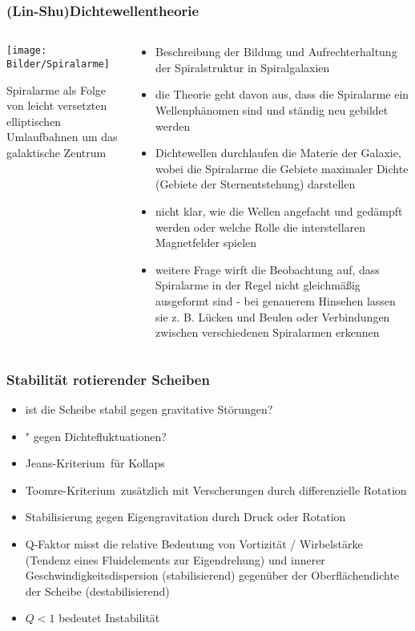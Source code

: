 \documentclass{beamer}
\begin{document}
\begin{frame}\frametitle{(Lin-Shu)Dichtewellentheorie}

\begin{columns}

\begin{column}{.48\textwidth}

\texttt{[image: Bilder/Spiralarme]}

Spiralarme als Folge von leicht versetzten elliptischen Umlaufbahnen um das galaktische Zentrum

\end{column}

\hfill

\begin{column}{.48\textwidth}

\tiny
\begin{itemize}
\item Beschreibung der Bildung und Aufrechterhaltung der Spiralstruktur in Spiralgalaxien
\item die Theorie geht davon aus, dass die Spiralarme ein Wellenphänomen sind und ständig neu gebildet werden
\item Dichtewellen durchlaufen die Materie der Galaxie, wobei die Spiralarme die Gebiete maximaler Dichte (Gebiete der Sternentstehung) darstellen
\item nicht klar, wie die Wellen angefacht und gedämpft werden oder welche Rolle die interstellaren Magnetfelder spielen
\item weitere Frage wirft die Beobachtung auf, dass Spiralarme in der Regel nicht gleichmäßig ausgeformt sind - bei genauerem Hinsehen lassen sie z. B. Lücken und Beulen oder Verbindungen zwischen verschiedenen Spiralarmen erkennen
\end{itemize}

\end{column}

\end{columns}

\end{frame}

\begin{frame}\frametitle{Stabilität rotierender Scheiben}

\begin{itemize}
\item ist die Scheibe stabil gegen gravitative Störungen?
\item " gegen Dichtefluktuationen?
\item \glqq Jeans-Kriterium\grqq \ für Kollaps
\item \glqq Toomre-Kriterium\grqq \ zusätzlich mit Verscherungen durch differenzielle Rotation
\item Stabilisierung gegen Eigengravitation durch Druck oder Rotation
\item Q-Faktor misst die relative Bedeutung von Vortizität / Wirbelstärke (Tendenz eines Fluidelements zur Eigendrehung) und innerer Geschwindigkeitsdispersion (stabilisierend) gegenüber der Oberflächendichte der Scheibe (destabilisierend)
\item $Q < 1$ bedeutet Instabilität
\end{itemize}

\end{frame}
\end{document}

